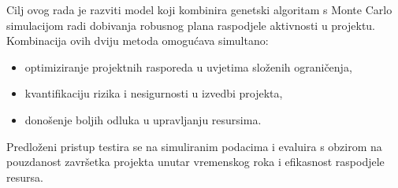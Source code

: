 Cilj ovog rada je razviti model koji kombinira genetski algoritam s Monte Carlo simulacijom radi dobivanja robusnog plana raspodjele aktivnosti u projektu. Kombinacija ovih dviju metoda omogućava simultano:
\begin{itemize}
    \item optimiziranje projektnih rasporeda u uvjetima složenih ograničenja,
    \item kvantifikaciju rizika i nesigurnosti u izvedbi projekta,
    \item donošenje boljih odluka u upravljanju resursima.
\end{itemize}

Predloženi pristup testira se na simuliranim podacima i evaluira s obzirom na pouzdanost završetka projekta unutar vremenskog roka i efikasnost raspodjele resursa.

